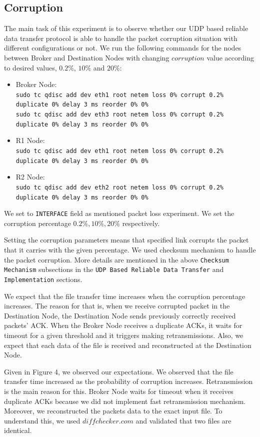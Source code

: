 \documentclass[conference]{IEEEtran}
\begin{document}
\subsection{Corruption}
The main task of this experiment is to observe whether our UDP based reliable data transfer protocol is able to handle the packet corruption situation with different configurations or not. We run the following commands for the nodes between Broker and Destination Nodes with changing $corruption$ value according to desired values, $0.2\%$, $10\%$ and $20\%$:
\begin{itemize}
    \item Broker Node: \\
        \texttt{sudo tc qdisc add dev eth1 root netem loss 0\% corrupt 0.2\% duplicate 0\% delay 3 ms reorder 0\% 0\%} \\
        \texttt{sudo tc qdisc add dev eth3 root netem loss 0\% corrupt 0.2\% duplicate 0\% delay 3 ms reorder 0\% 0\%}
        \item R1 Node: \\
        \texttt{sudo tc qdisc add dev eth1 root netem loss 0\% corrupt 0.2\% duplicate 0\% delay 3 ms reorder 0\% 0\%}
        \item R2 Node: \\
        \texttt{sudo tc qdisc add dev eth2 root netem loss 0\% corrupt 0.2\% duplicate 0\% delay 3 ms reorder 0\% 0\%}
\end{itemize}
\par We set to \texttt{INTERFACE} field as mentioned packet loss experiment. We set the corruption percentage $0.2\%, 10\%, 20\%$ respectively.
\par Setting the corruption parameters means that specified link corrupts the packet that it carries with the given percentage. We used checksum mechanism to handle the packet corruption. More details are mentioned in the above  \texttt{Checksum Mechanism} subsections in the \texttt{UDP Based Reliable Data Transfer} and \texttt{Implementation} sections.
\par We expect that the file transfer time increases when the corruption percentage increases. The reason for that is, when we receive corrupted packet in the Destination Node, the Destination Node sends 
previously correctly received packets' ACK. When the Broker Node receives a duplicate ACKs, it waits for timeout for a given threshold and it triggers making retransmissions. Also, we expect that each data of the file is received and reconstructed at the Destination Node.
\par Given in Figure 4, we observed our expectations. We observed that the file transfer time increased as the probability of corruption increases. Retransmission is the main reason for this. Broker Node waits for timeout when it receives duplicate ACKs because we did not implement fast retransmission mechanism. Moreover, we reconstructed the packets data to the exact input file. To understand this, we used $diffchecker.com$ and validated that two files are identical.
\end{document}
